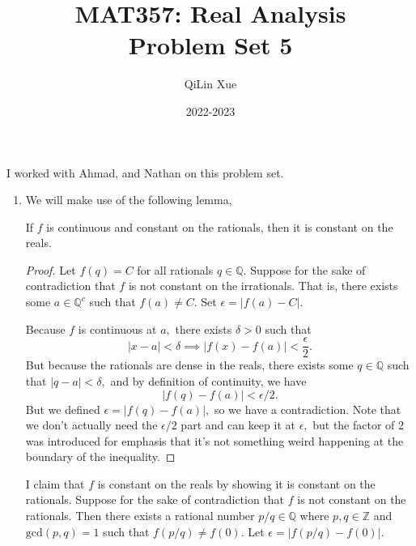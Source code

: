 \documentclass{article}
\title{\vspace{-2cm}MAT357: Real Analysis \\ Problem Set 5}
\author{QiLin Xue}
\date{2022-2023}
\numberwithin{equation}{section}
\begin{document}
\maketitle
I worked with Ahmad, and Nathan on this problem set.
\begin{enumerate}
    \item We will make use of the following lemma,
    \begin{lemma}
        If $f$ is continuous and constant on the rationals, then it is constant on the reals.
        \begin{proof}
            Let $f(q)=C$ for all rationals $q\in \mathbb{Q}.$ Suppose for the sake of contradiction that $f$ is not constant on the irrationals. That is, there exists some $a \in \mathbb{Q}^c$ such that $f(a) \neq C.$ Set $\epsilon = |f(a)-C|.$ 
            \vspace{2mm}

            Because $f$ is continuous at $a,$ there exists $\delta > 0$ such that 
            \begin{equation}
                |x-a| < \delta \implies |f(x)-f(a)| < \frac{\epsilon}{2}.
            \end{equation}
            But because the rationals are dense in the reals, there exists some $q\in \mathbb{Q}$ such that $|q-a|<\delta,$ and by definition of continuity, we have 
            \begin{equation}
                |f(q)-f(a)| < \epsilon/2.
            \end{equation}
            But we defined $\epsilon = |f(q)-f(a)|,$ so we have a contradiction. Note that we don't actually need the $\epsilon/2$ part and can keep it at $\epsilon,$ but the factor of 2 was introduced for emphasis that it's not something weird happening at the boundary of the inequality.
        \end{proof}
    \end{lemma}
    I claim that $f$ is constant on the reals by showing it is constant on the rationals. Suppose for the sake of contradiction that $f$ is not constant on the rationals. Then there exists a rational number $p/q \in \mathbb{Q}$ where $p,q\in \mathbb{Z}$ and $\text{gcd}(p,q)=1$ such that $f(p/q) \neq f(0).$ Let $\epsilon = |f(p/q)-f(0)|.$


\end{enumerate}
\end{document}
